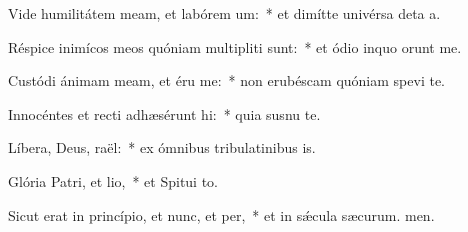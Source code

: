 \item Vide humilitátem meam, et labórem um:~* et dimítte univérsa deta a.
\item Réspice inimícos meos quóniam multipliti sunt:~* et ódio inquo orunt me.
\item Custódi ánimam meam, et éru me:~* non erubéscam quóniam spevi  te.
\item Innocéntes et recti adhæsérunt hi:~* quia susnu te.
\item Líbera, Deus, raël:~* ex ómnibus tribulatinibus is.
\item Glória Patri, et lio,~* et Spitui to.
\item Sicut erat in princípio, et nunc, et per,~* et in sǽcula sæcurum. men.
